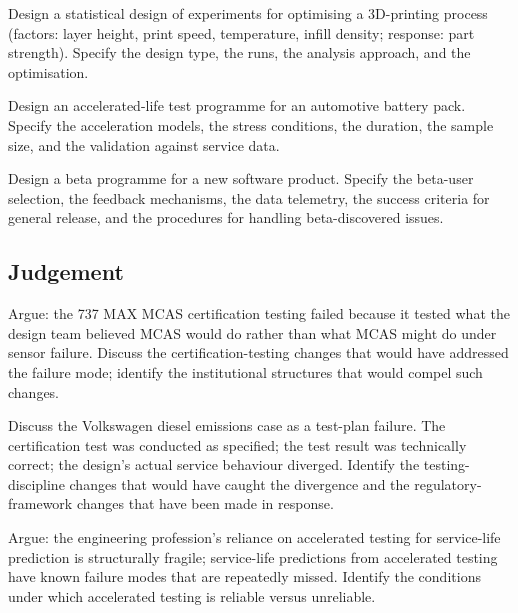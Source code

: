 \begin{exercise}
Design a statistical design of experiments for optimising a 3D-printing process (factors: layer height, print speed, temperature, infill density; response: part strength). Specify the design type, the runs, the analysis approach, and the optimisation.
\end{exercise}

\begin{exercise}
Design an accelerated-life test programme for an automotive battery pack. Specify the acceleration models, the stress conditions, the duration, the sample size, and the validation against service data.
\end{exercise}

\begin{exercise}
Design a beta programme for a new software product. Specify the beta-user selection, the feedback mechanisms, the data telemetry, the success criteria for general release, and the procedures for handling beta-discovered issues.
\end{exercise}

\subsection*{Judgement}

\begin{exercise}
Argue: the 737 MAX MCAS certification testing failed because it tested what the design team believed MCAS would do rather than what MCAS might do under sensor failure. Discuss the certification-testing changes that would have addressed the failure mode; identify the institutional structures that would compel such changes.
\end{exercise}

\begin{exercise}
Discuss the Volkswagen diesel emissions case as a test-plan failure. The certification test was conducted as specified; the test result was technically correct; the design's actual service behaviour diverged. Identify the testing-discipline changes that would have caught the divergence and the regulatory-framework changes that have been made in response.
\end{exercise}

\begin{exercise}
Argue: the engineering profession's reliance on accelerated testing for service-life prediction is structurally fragile; service-life predictions from accelerated testing have known failure modes that are repeatedly missed. Identify the conditions under which accelerated testing is reliable versus unreliable.
\end{exercise}

